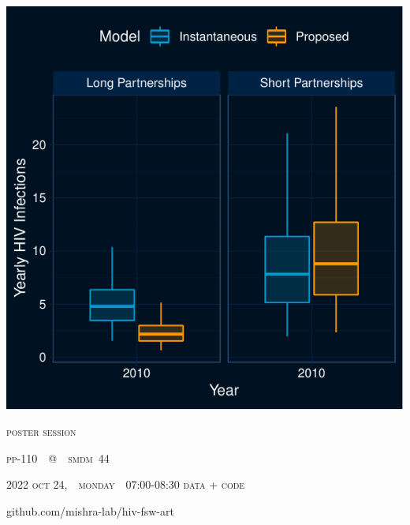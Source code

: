\documentclass[aspectratio=169]{beamer}
\begin{document}
  \begin{frame}\centering
    \includegraphics[height=.8\textheight]{obj2b}
  \end{frame}
  \begin{frame}\raggedleft
    \vfill
    \textsc{poster session}\par
    \textsc{pp-110~~{\footnotesize @}~~smdm~44}\par
    \textsc{2022 oct 24,~~monday~~07:00-08:30}
    \vfill
    \textsc{data + code}\par
    github.com/mishra-lab/hiv-fsw-art
    \vfill
  \end{frame}
\end{document}
